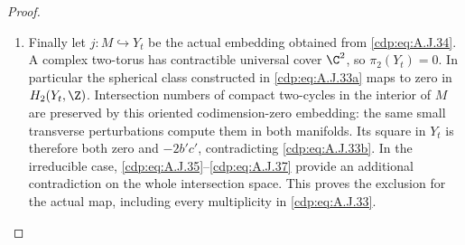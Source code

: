 \begin{proof}
\begin{enumerate}[label={$\langle1\rangle$\arabic*.},leftmargin=*]
\item Finally let $j:M\hookrightarrow Y_t$ be the actual
embedding obtained from \eqref{cdp:eq:A.J.34}. A complex two-torus
has contractible universal cover $\C^2$, so
$\pi_2(Y_t)=0$. In particular the spherical class
constructed in \eqref{cdp:eq:A.J.33a} maps to zero in
$H_2(Y_t,\Z)$. Intersection numbers of compact
two-cycles in the interior of $M$ are preserved by
this oriented codimension-zero embedding: the same
small transverse perturbations compute them in
both manifolds. Its square in $Y_t$ is therefore
both zero and $-2b'c'$, contradicting \eqref{cdp:eq:A.J.33b}.
In the irreducible case, \eqref{cdp:eq:A.J.35}--\eqref{cdp:eq:A.J.37} provide
an additional contradiction on the whole intersection
space.
This proves the exclusion for the actual map,
including every multiplicity in \eqref{cdp:eq:A.J.33}.

\end{enumerate}
\end{proof}
